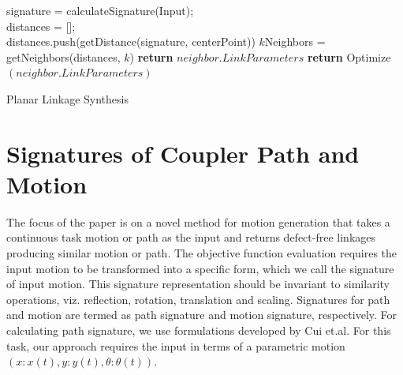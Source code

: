 \documentclass[twocolumn,10pt]{asme2ej}
\begin{document}
\begin{algorithm}
    signature = calculateSignature(Input); \\
    distances = [];\\
    {
      distances.push(getDistance(signature, centerPoint))
    }
    $k$Neighbors = getNeighbors(distances, $k$)
    {
      {
        \textbf{return} $neighbor.LinkParameters$
      }
      {
        \textbf{return} Optimize$(neighbor.LinkParameters)$
      }
    }
    \caption{Planar Linkage Synthesis}
    \label{alg_overall}
\end{algorithm}

\section{Signatures of Coupler Path and Motion}\label{sec_sign}
The focus of the paper is on a novel method for motion generation that takes a continuous task motion or path as the input and returns defect-free linkages producing similar motion or path. The objective function evaluation requires the input motion to be transformed into a specific form, which we call the signature of input motion.
This signature representation should be invariant to similarity operations, viz. reflection, rotation, translation and scaling.
Signatures for path and motion are termed as path signature and motion signature, respectively.
For calculating path signature, we use formulations developed by Cui et.al\cite{cui2009}.
For this task, our approach requires the input in terms of a parametric motion $(x:x(t), y:y(t), \theta:\theta(t))$.
\end{document}
